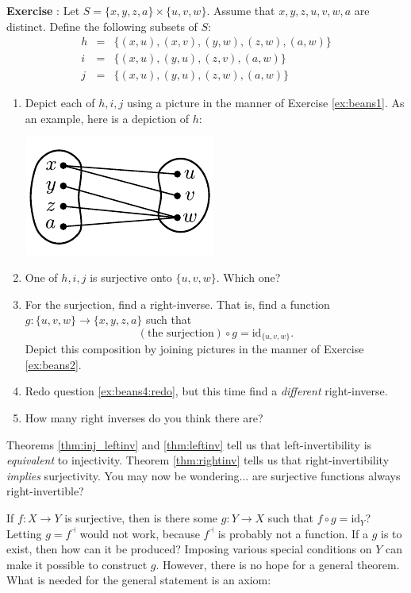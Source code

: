 \documentclass[12pt]{article}
\newcommand{\rev}[1]{{#1}^{\dashv}}
\newcommand{\id}[1]{\textrm{id}_{#1}}
\newcounter{exercise}
\newcounter{theorem}
\def\putExerciseHeading{\refstepcounter{exercise} \textbf{Exercise \theexercise}}
\newcommand{\ex}[1]{ \putExerciseHeading: #1}
\begin{document}
\ex{\label{ex:beans4}Let
$S=\{x,y,z,a\}\times\{u,v,w\}$.
Assume that $x,y,z,u,v,w,a$ are distinct.
Define the following subsets of $S$:
$$\begin{array}{lll}
h&=&\{
(x,u),(x,v),(y,w),(z,w),(a,w)
\}\\
i&=&\{
(x,u),(y,u),(z,v),(a,w)
\}\\
j&=&\{
(x,u),(y,u),(z,w),(a,w)
\}
\end{array}$$
\begin{enumerate}
\item Depict each of $h,i,j$ using a picture in the manner of Exercise \ref{ex:beans1}.
As an example, here is a depiction of $h$:
\begin{center}
\includegraphics[scale=1]{beans6.pdf}
\end{center}
\item One of $h,i,j$ is surjective onto $\{u,v,w\}$.
Which one?
\item\label{ex:beans4:redo}
For the surjection, find a right-inverse.
That is, find a function $g:\{u,v,w\}\rightarrow\{x,y,z,a\}$ such that
$$ (\text{the surjection})\circ g = \id{\{u,v,w\}}. $$
Depict this composition by joining pictures in the manner of Exercise \ref{ex:beans2}.
\item
Redo question \ref{ex:beans4:redo}, but this time find a \emph{different} right-inverse.
\item How many right inverses do you think there are?
\end{enumerate}
}

\vspace{2em}

Theorems \ref{thm:inj_leftinv} and \ref{thm:leftinv} tell us
that left-invertibility is \emph{equivalent} to injectivity.
Theorem \ref{thm:rightinv} tells us that right-invertibility \emph{implies} surjectivity.
You may now be wondering... are surjective functions always right-invertible?

If $f:X\rightarrow Y$ is surjective, then is there some $g:Y\rightarrow X$ such that $f\circ g=\id{Y}$?
Letting $g=\rev{f}$ would not work, because $\rev{f}$ is probably not a function.
If a $g$ is to exist, then how can it be produced?
Imposing various special conditions on $Y$ can make it possible to construct $g$.
However, there is no hope for a general theorem. What is needed for the general statement is an axiom:
\end{document}
